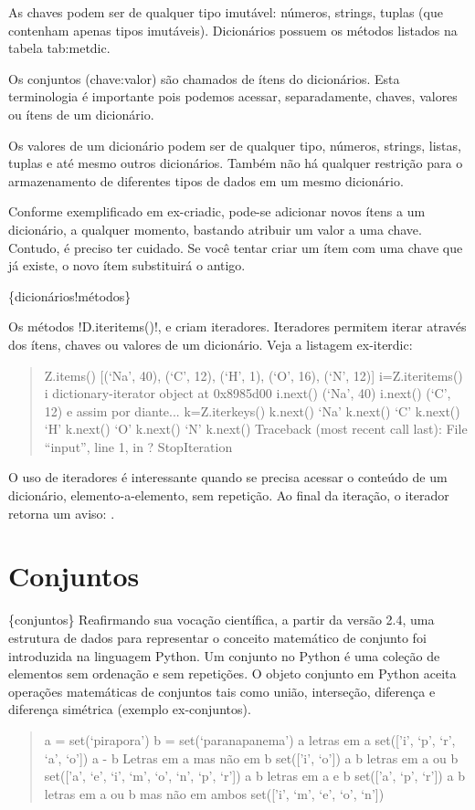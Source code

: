 \documentclass[a4paper,10pt,portuguese]{sphinxmanual}
\begin{document}
As chaves podem ser de qualquer tipo imutável: números, strings,
tuplas (que contenham apenas tipos imutáveis). Dicionários possuem
os métodos listados na tabela tab:metdic.

Os conjuntos (chave:valor) são chamados de ítens do dicionários.
Esta terminologia é importante pois podemos acessar, separadamente,
chaves, valores ou ítens de um dicionário.

Os valores de um dicionário podem ser de qualquer tipo, números,
strings, listas, tuplas e até mesmo outros dicionários. Também não
há qualquer restrição para o armazenamento de diferentes tipos de
dados em um mesmo dicionário.

Conforme exemplificado em ex-criadic, pode-se adicionar novos ítens
a um dicionário, a qualquer momento, bastando atribuir um valor a
uma chave. Contudo, é preciso ter cuidado. Se você tentar criar um
ítem com uma chave que já existe, o novo ítem substituirá o
antigo.

\{dicionários!métodos\}

Os métodos !D.iteritems()!,  e 
criam iteradores. Iteradores permitem iterar através dos ítens,
chaves ou valores de um dicionário. Veja a listagem ex-iterdic:
\begin{quote}

Z.items() {[}(`Na', 40), (`C', 12), (`H', 1), (`O', 16), (`N', 12){]}
i=Z.iteritems() i dictionary-iterator object at 0x8985d00 i.next()
(`Na', 40) i.next() (`C', 12) e assim por diante... k=Z.iterkeys()
k.next() `Na' k.next() `C' k.next() `H' k.next() `O' k.next() `N'
k.next() Traceback (most recent call last): File ``input'', line 1,
in ? StopIteration
\end{quote}

O uso de iteradores é interessante quando se precisa acessar o
conteúdo de um dicionário, elemento-a-elemento, sem repetição. Ao
final da iteração, o iterador retorna um aviso: .


\section{Conjuntos}
\label{Cap2:conjuntos}
\{conjuntos\} Reafirmando sua vocação científica, a partir da versão
2.4, uma estrutura de dados para representar o conceito matemático
de conjunto foi introduzida na linguagem Python. Um conjunto no
Python é uma coleção de elementos sem ordenação e sem repetições. O
objeto conjunto em Python aceita operações matemáticas de conjuntos
tais como união, interseção, diferença e diferença simétrica
(exemplo ex-conjuntos).
\begin{quote}

a = set(`pirapora') b = set(`paranapanema') a letras em a set({[}'i',
`p', `r', `a', `o'{]}) a - b Letras em a mas não em b set({[}'i', `o'{]})
a b letras em a ou b set({[}'a', `e', `i', `m', `o', `n', `p', `r'{]})
a b letras em a e b set({[}'a', `p', `r'{]}) a b letras em a ou b mas
não em ambos set({[}'i', `m', `e', `o', `n'{]})
\end{quote}
\end{document}
